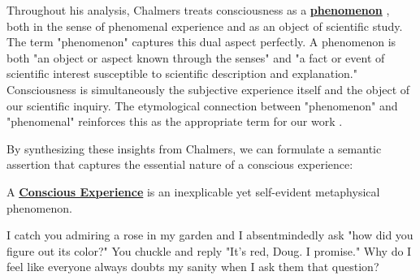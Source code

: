 \documentclass[runningheads]{llncs}
\newcommand{\link}[2]{%
\href{#1}{\textcolor{wikiblue}{#2}\xspace}%
}
\newcommand{\repo}[2]{%
\link{https://github.com/DNA-Platform/inexplicable-phenomena/blob/main/#1}{#2}\xspace%
}
\newcommand{\ConsciousExperience}[0]{%
\repo{research/consciousness/a-novel-perspective-on-vision.md}{Conscious Experience}%
}
\newcommand{\phenomenon}[0]{%
\repo{research/consciousness/a-novel-perspective-on-vision.md}{phenomenon}%
}
\begin{document}
Throughout his analysis, Chalmers treats consciousness as a \textbf{\phenomenon}, both in the sense of phenomenal experience and as an object of scientific study. The term "phenomenon" captures this dual aspect perfectly. A phenomenon is both "an object or aspect known through the senses" and "a fact or event of scientific interest susceptible to scientific description and explanation." Consciousness is simultaneously the subjective experience itself and the object of our scientific inquiry. The etymological connection between "phenomenon" and "phenomenal" reinforces this as the appropriate term for our work \cite{Bader2022}.

By synthesizing these insights from Chalmers, we can formulate a semantic assertion that captures the essential nature of a conscious experience:

\begin{assertion}
	A \textbf{\ConsciousExperience} is an inexplicable yet self-evident metaphysical phenomenon.
\end{assertion}

\begin{aexample}
I catch you admiring a rose in my garden and I absentmindedly ask "how did you figure out its color?" You chuckle and reply "It's red, Doug. I promise." Why do I feel like everyone always doubts my sanity when I ask them that question?
\end{aexample}


\end{document}
